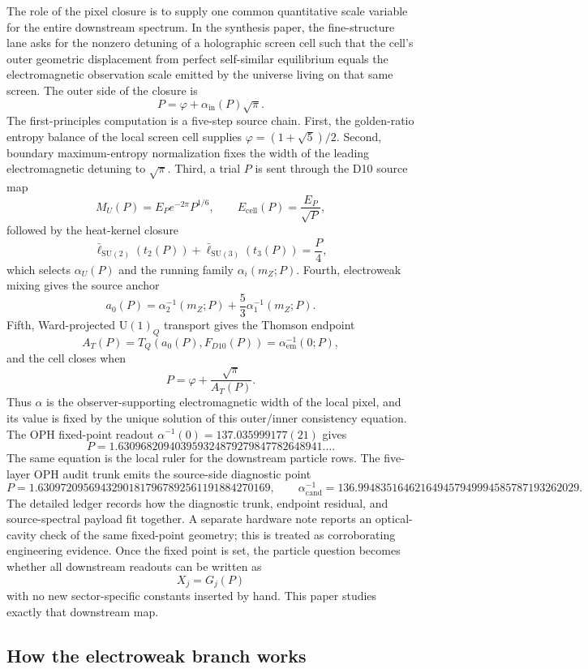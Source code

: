\documentclass[11pt]{article}
\newcommand{\U}{\mathrm{U}}
\begin{document}
The role of the pixel closure is to supply one common quantitative scale
variable for the entire downstream spectrum. In the synthesis paper, the
fine-structure lane asks for the nonzero detuning of a holographic screen cell
such that the cell's outer geometric displacement from perfect self-similar
equilibrium equals the electromagnetic observation scale emitted by the
universe living on that same screen.
The outer side of the closure is
\[
P=\varphi+\alpha_{\mathrm{in}}(P)\sqrt{\pi}.
\]
The first-principles computation is a five-step source chain. First, the
golden-ratio entropy balance of the local screen cell supplies
\(\varphi=(1+\sqrt5)/2\). Second, boundary maximum-entropy normalization fixes
the width of the leading electromagnetic detuning to \(\sqrt{\pi}\). Third, a
trial \(P\) is sent through the D10 source map
\[
M_U(P)=E_P e^{-2\pi}P^{1/6},\qquad E_{\mathrm{cell}}(P)=\frac{E_P}{\sqrt P},
\]
followed by the heat-kernel closure
\[
\bar\ell_{\mathrm{SU}(2)}(t_2(P))+\bar\ell_{\mathrm{SU}(3)}(t_3(P))=\frac{P}{4},
\]
which selects \(\alpha_U(P)\) and the running family
\(\alpha_i(m_Z;P)\). Fourth, electroweak mixing gives the source anchor
\[
a_0(P)=\alpha_2^{-1}(m_Z;P)+\frac53\alpha_1^{-1}(m_Z;P).
\]
Fifth, Ward-projected \(\U(1)_Q\) transport gives the Thomson endpoint
\[
A_T(P)=T_Q(a_0(P),F_{D10}(P))=\alpha_{\mathrm{em}}^{-1}(0;P),
\]
and the cell closes when
\[
P=\varphi+\frac{\sqrt{\pi}}{A_T(P)}.
\]
Thus \(\alpha\) is the observer-supporting electromagnetic width of the local
pixel, and its value is fixed by the unique solution of this outer/inner
consistency equation.
The OPH fixed-point readout
\(\alpha^{-1}(0)=137.035999177(21)\) gives
\[
P=1.630968209403959324879279847782648941\ldots.
\]
The same equation is the local ruler for the downstream particle rows. The five-layer
OPH audit trunk emits the source-side diagnostic point
\[
P=1.63097209569432901817967892561191884270169,
\qquad
\alpha_{\mathrm{cand}}^{-1}=136.994835164621649457949994585787193262029.
\]
The detailed ledger records how the diagnostic trunk, endpoint residual, and
source-spectral payload fit together.
A separate hardware note reports an optical-cavity check of the same fixed-point geometry;
this is treated as corroborating engineering evidence.
Once the fixed point is set, the particle question becomes whether all downstream readouts
can be written as
\[
X_j = G_j(P)
\]
with no new sector-specific constants inserted by hand. This paper studies exactly that downstream
map.

\subsection{How the electroweak branch works}
\end{document}
